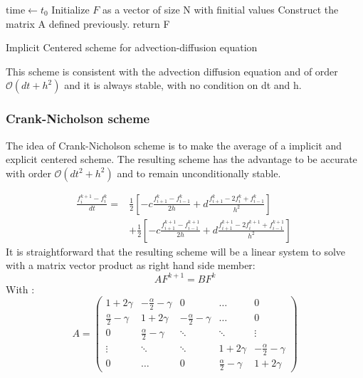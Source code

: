 \documentclass[11pt,a4paper]{article}
\begin{document}
\IncMargin{1em}
\begin{algorithm}[H]
	\BlankLine
	$\text{time} \leftarrow  t_0$ \;
	Initialize $F$ as a vector of size N with f{initial} values\;
	Construct the matrix A defined previously.
	\BlankLine
	\BlankLine
	return F
	
	
\caption{Implicit Centered scheme for advection-diffusion equation}\label{alg:implicit_center}
\end{algorithm}
\DecMargin{1em}

This scheme is consistent with the advection diffusion equation and of order $\mathcal{O}(dt+h^2)$ and it is always stable, with no condition on dt and h.


\subsubsection{Crank-Nicholson scheme}
The idea of Crank-Nicholson scheme is to make the average of a implicit and explicit centered scheme. The resulting scheme has the advantage to be accurate with order $\mathcal{O}(dt^2+h^2)$ and to remain unconditionally stable.


\begin{align*}\label{eq:CrankNicolson}
\frac{f_i^{k+1} - f_i^{k}}{dt} =& \frac{1}{2} \left[ - c \frac{f_{i+1}^{k} - f_{i-1}^{k}}{2h} 
								 + d \frac{f_{i+1}^{k} - 2 f_{i}^{k} + f_{i-1}^{k}}{h^{2}} \right] \\ 									&+ \frac{1}{2} \left[ 
								 - c \frac{f_{i+1}^{k+1} - f_{i-1}^{k+1}}{2h} 
								 + d \frac{f_{i+1}^{k+1} - 2 f_{i}^{k+1} 
								 + f_{i-1}^{k+1}}{h^{2}} \right] \
\end{align*}
It is straightforward that the resulting scheme will be a linear system to solve with a matrix vector product as right hand side member: 
\[ A F^{k+1} = B F^k\]
With :
 \[
A = \begin{pmatrix}
      1+2\gamma & -\frac{\alpha}{2} - \gamma & 0   & \dots     & 0   \\
      \frac{\alpha}{2} -  \gamma & 1+2\gamma       & -\frac{\alpha}{2} - \gamma   & \dots     & 0 \\
      0&         \frac{\alpha}{2} -  \gamma& \ddots         & \ddots    & \vdots    \\
      \vdots&         \ddots&           \ddots &     1+2\gamma      & -\frac{\alpha}{2} - \gamma  \\
      0&         \dots&           0&          \frac{\alpha}{2} -  \gamma & 1+2\gamma
  \end{pmatrix}
\]
\end{document}
